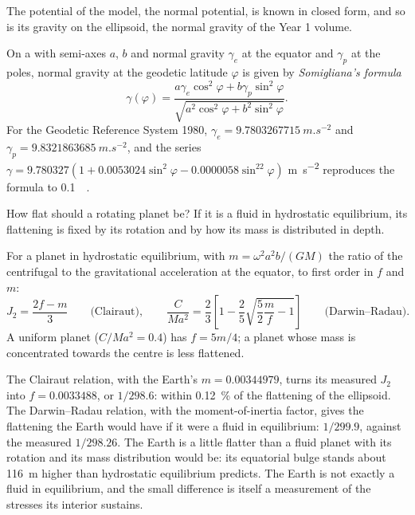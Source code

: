 The potential of the model, the normal potential, is known in closed form, and
so is its gravity on the ellipsoid, the normal gravity of the Year 1 volume.

\begin{proposition}\label{prop:b3:gravity-geodesy:somigliana}
On a  with semi-axes $a$, $b$ and normal gravity
$\gamma_e$ at the equator and $\gamma_p$ at the poles, normal gravity at the
geodetic latitude $\varphi$ is given by \emph{Somigliana's
formula}
\[
  \gamma(\varphi) = \frac{a\gamma_e\cos^2\varphi + b\gamma_p\sin^2\varphi}
  {\sqrt{a^2\cos^2\varphi + b^2\sin^2\varphi}} .
\]
For the Geodetic Reference System 1980, $\gamma_e = \qty{9.7803267715}{m.s^{-2}}$
and $\gamma_p = \qty{9.8321863685}{m.s^{-2}}$, and the series
$\gamma = 9.780327(1 + 0.0053024\sin^2\varphi - 0.0000058\sin^22\varphi)$
\unit{m.s^{-2}} reproduces the formula to \qty{0.1}{\milli\gal}.
\end{proposition}
\admitted

How flat should a rotating planet be? If it is a fluid in hydrostatic
equilibrium, its flattening is fixed by its rotation and by how its mass is
distributed in depth.

\begin{proposition}\label{prop:b3:gravity-geodesy:clairaut}
For a planet in hydrostatic equilibrium, with $m = \omega^2a^2b/(GM)$ the ratio
of the centrifugal to the gravitational acceleration at the equator, to first
order in $f$ and $m$:
\[
  J_2 = \frac{2f - m}{3}\qquad\text{(Clairaut)},\qquad
  \frac{C}{Ma^2} = \frac23\left[1 - \frac25\sqrt{\frac52\frac mf - 1}\right]
  \qquad\text{(Darwin--Radau)} .
\]
A uniform planet ($C/Ma^2 = 0.4$) has $f = 5m/4$; a planet whose mass is
concentrated towards the centre is less flattened.
\end{proposition}
\admitted

The Clairaut relation, with the Earth's $m = \num{0.00344979}$, turns its
measured $J_2$ into $f = \num{0.0033488}$, or $1/298.6$: within
\qty{0.12}{\percent} of the flattening of the ellipsoid. The Darwin--Radau
relation, with the moment-of-inertia factor, gives the flattening the Earth
would have if it were a fluid in equilibrium: $1/299.9$, against the measured
$1/298.26$. The Earth is a little flatter than a fluid planet with its rotation
and its mass distribution would be: its equatorial bulge stands about
\qty{116}{m} higher than hydrostatic equilibrium predicts. The Earth is not
exactly a fluid in equilibrium, and the small difference is itself a
measurement of the stresses its interior sustains.

